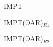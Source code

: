 
\newpage

\begin{figure}[H]

\hfill
\begin{minipage}{0.3\textwidth}
\hspace*{1.6cm} IMPT 
\end{minipage}
\hfill
\begin{minipage}{0.3\textwidth}
 \hspace*{1.3cm} IMPT(OAR)$_{R1}$ 
\end{minipage}
\hfill
\begin{minipage}{0.3\textwidth}
\hspace*{1.3cm} IMPT(OAR)$_{R2}$ 
\end{minipage}
\hfill

\vspace*{0.3cm}


\end{figure}
